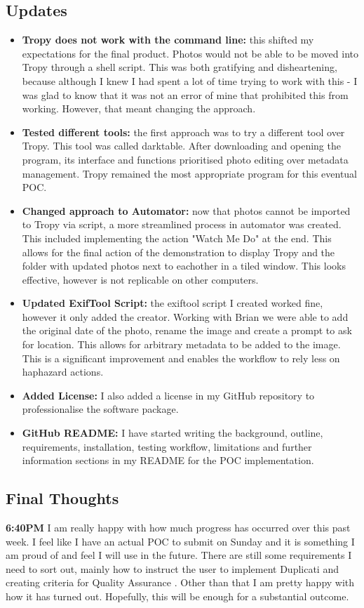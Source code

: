 \documentclass{article}
\begin{document}
\subsection{Updates}
\begin{itemize}
\item \textbf{Tropy does not work with the command line:} this shifted my expectations for the final product. Photos would not be able to be moved into Tropy through a shell script. This was both gratifying and disheartening, because although I knew I had spent a lot of time trying to work with this - I was glad to know that it was not an error of mine that prohibited this from working. However, that meant changing the approach.
\item \textbf{Tested different tools:} the first approach was to try a different tool over Tropy. This tool was called darktable. After downloading and opening the program, its interface and functions prioritised photo editing over metadata management. Tropy remained the most appropriate program for this eventual POC.
\item \textbf{Changed approach to Automator:} now that photos cannot be imported to Tropy via script, a more streamlined process in automator was created. This included implementing the action "Watch Me Do" at the end. This allows for the final action of the demonstration to display Tropy and the folder with updated photos next to eachother in a tiled window. This looks effective, however is not replicable on other computers.
\item \textbf{Updated ExifTool Script:} the exiftool script I created worked fine, however it only added the creator. Working with Brian we were able to add the original date of the photo, rename the image and create a prompt to ask for location. This allows for arbitrary metadata to be added to the image. This is a significant improvement and enables the workflow to rely less on haphazard actions.
\item \textbf{Added License:} I also added a license in my GitHub repository to professionalise the software package. 
\item \textbf{GitHub README:} I have started writing the background, outline, requirements, installation, testing workflow, limitations and further information sections in my README for the POC implementation. 
\end{itemize}

\subsection{Final Thoughts}
\textbf{6:40PM} I am really happy with how much progress has occurred over this past week. I feel like I have an actual POC to submit on Sunday and it is something I am proud of and feel I will use in the future. There are still some requirements I need to sort out, mainly how to instruct the user to implement Duplicati and creating criteria for Quality Assurance . Other than that I am pretty happy with how it has turned out. Hopefully, this will be enough for a substantial outcome. 
\end{document}
